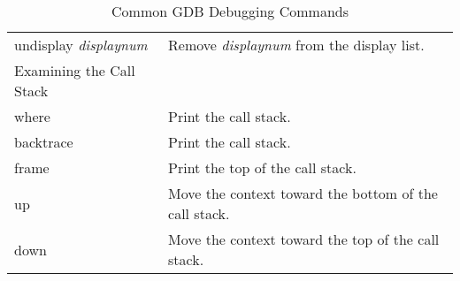 \begin{table}[h]
\begin{tabular}{l | l}
undisplay\index{undisplay} \emph{displaynum} & Remove \emph{displaynum} from the display list. \\
Examining the Call Stack \\
where\index{where} & Print the call stack. \\
backtrace\index{backtrace} & Print the call stack. \\
frame\index{frame} & Print the top of the call stack. \\
up\index{up} & Move the context toward the bottom of the call stack. \\
down\index{down} & Move the context toward the top of the call stack. \\
\end{tabular}
\caption{Common GDB Debugging Commands}
\end{table}

